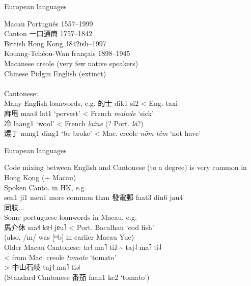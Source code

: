 \documentclass{beamer}
\begin{document}
\begin{frame}[fragile]{European languages}

Macau Português 1557–1999\\
Canton 一口通商 1757–1842\\
British Hong Kong 1842ish–1997\\
Kouang-Tchéou-Wan français 1898–1945\\
\medskip
Macanese creole (very few native speakers)\\
Chinese Pidgin English (extinct)\\
 \\  
\medskip
Cantonese:\\
Many English loanwords, e.g. 的士 dik1 si2 < Eng. taxi\\
麻甩 maa4 lat1 \enquote*{pervert} < French \textit{malade} \enquote*{sick}\\
冷 laang1 \enquote*{wool} < French \textit{laine} (? Port. \textit{lã}?)\\
燶丁 nung1 ding1 \enquote*{be broke} < Mac. creole \textit{nôm têm} \enquote*{not have}\\

\end{frame}

\begin{frame}[fragile]{European languages}

Code mixing between English and Cantonese (to a degree) is very common in Hong Kong (+ Macau)\\
\smallskip
Spoken Canto. in HK, e.g.\\ 
sen1 ji1 meu1 more common than 發電郵 faat3 din6 jau4\\
\smallskip
同朕...\\
\bigskip
Some portuguese loanwords in Macau, e.g.\\
馬介休 ma˨˦ kɐ˧ jɐu˥ < Port. Bacalhau \enquote*{cod fish}\\
(also, /m/ was [ᵐb] in earlier Macau Yue)\\
\smallskip
Older Macau Cantonese: ta˧ ma˥ ti˩ \~{} taj˨ ma˥ ti˨\\ 
\quad < from Mac. creole \textit{tomate} \enquote*{tomato}\\
> 中山石岐 taj˧ ma˥ ti˨˩˧\\
\quad (Standard Cantonese 番茄 faan1 ke2 \enquote*{tomato})\\

\end{frame}
\end{document}
